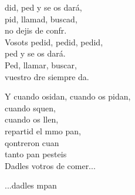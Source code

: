 \begin{cancion}%
	did, ped y se os dará,\\
	pid, llamad, buscad,\\
	no dejis de confr.\\
	Vosots pedid, pedid, pedid, \\
	ped y se os dará.\\
	Ped, llamar, buscar, \\
	vuestro dre siempre da.\jump\\
	\begin{chorus}%
		Y cuando osidan, cuando os pidan,\\
		cuando squen,\\
		cuando os llen, \\
		repartid el mmo pan,\\
		qontreron cuan\\
		tanto pan pesteis\\
		Dadles votros de comer...\jump\\
	\end{chorus}%
	...dadles mpan\\
\end{cancion}%
